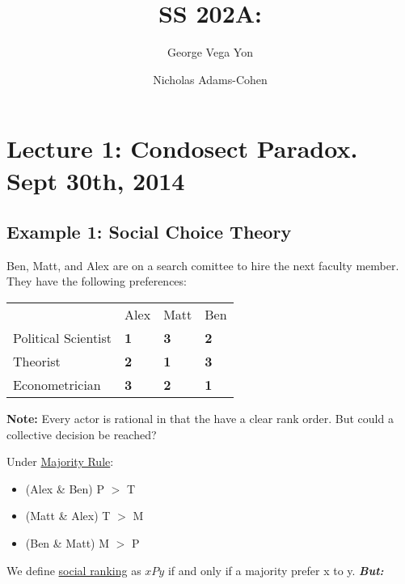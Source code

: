\documentclass{article}
\title{SS 202A: }
\author{George Vega Yon\and Nicholas Adams-Cohen}
\begin{document}
\maketitle


\section*{Lecture 1: Condosect Paradox. Sept 30th, 2014}

\subsection*{Example 1: Social Choice Theory}
Ben, Matt, and Alex are on a search comittee to hire the next faculty member. They have the following preferences: 

\begin{table}[h]
\centering
\begin{tabular}{llll}
                                         & Alex                            & Matt                            & Ben                             \\ \cline{2-4} 
\multicolumn{1}{l|}{Political Scientist} & \multicolumn{1}{l|}{\textbf{1}} & \multicolumn{1}{l|}{\textbf{3}} & \multicolumn{1}{l|}{\textbf{2}} \\ \cline{2-4} 
\multicolumn{1}{l|}{Theorist}            & \multicolumn{1}{l|}{\textbf{2}} & \multicolumn{1}{l|}{\textbf{1}} & \multicolumn{1}{l|}{\textbf{3}} \\ \cline{2-4} 
\multicolumn{1}{l|}{Econometrician}      & \multicolumn{1}{l|}{\textbf{3}} & \multicolumn{1}{l|}{\textbf{2}} & \multicolumn{1}{l|}{\textbf{1}} \\ \cline{2-4} 
\end{tabular}
\end{table}

\textbf{Note:} Every actor is rational in that the have a clear rank order. But could a collective decision be reached?

Under \underline{Majority Rule}:
\begin{itemize}

\item (Alex \& Ben) P $>$ T
\item (Matt \& Alex) T $>$ M
\item (Ben \& Matt) M $>$ P
\end{itemize}

We define \underline{social ranking} as $xPy$ if and only if a majority prefer x to y. 
\emph{\textbf{But:}}
\end{document}
